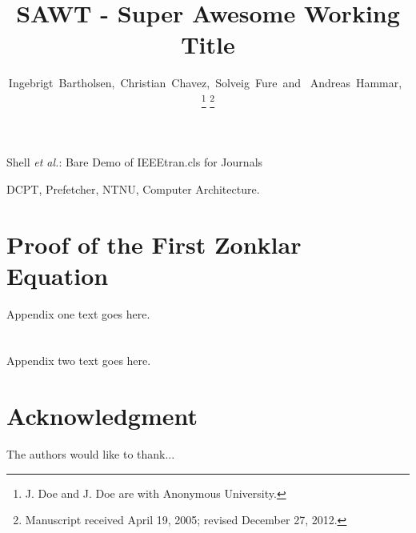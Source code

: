 \documentclass[journal]{IEEEtran}
\begin{document}
\title{SAWT - Super Awesome Working Title}

\author{Ingebrigt~Bartholsen,~Christian~Chavez,~Solveig~Fure~and ~Andreas~Hammar,~

\thanks{J. Doe and J. Doe are with Anonymous University.}
\thanks{Manuscript received April 19, 2005; revised December 27, 2012.}}

%
{Shell \MakeLowercase{\textit{et al.}}: Bare Demo of IEEEtran.cls for Journals}


\maketitle



\begin{IEEEkeywords}
DCPT, Prefetcher, NTNU, Computer Architecture.
\end{IEEEkeywords}
\IEEEpeerreviewmaketitle

















\appendices
\section{Proof of the First Zonklar Equation}
Appendix one text goes here.

\section{}
Appendix two text goes here.


\section*{Acknowledgment}

The authors would like to thank...

\ifCLASSOPTIONcaptionsoff
  \newpage
\fi

\end{document}
